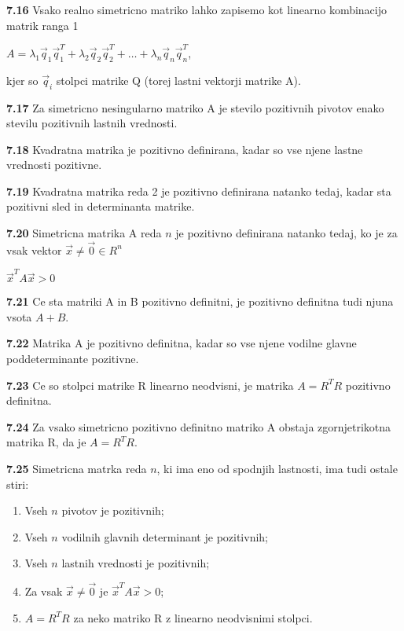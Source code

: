 \documentclass{article}
\begin{document}
\begin{multicols}{2}
\textbf{7.16} Vsako realno simetricno matriko lahko zapisemo kot linearno kombinacijo matrik ranga 1
\begin{center}
    \begin{math}
        A = \lambda_{1}\vec{q}_{1}\vec{q}_{1}^{T} + \lambda_{2}\vec{q}_{2}\vec{q}_{2}^{T} +
        \dots + \lambda_{n}\vec{q}_{n}\vec{q}_{n}^{T} 
    \end{math},
\end{center}
kjer so $\vec{q}_{i}$ stolpci matrike Q (torej lastni vektorji matrike A).

\textbf{7.17} Za simetricno nesingularno matriko A je stevilo pozitivnih pivotov enako
stevilu pozitivnih lastnih vrednosti.

\textbf{7.18} Kvadratna matrika je pozitivno definirana, kadar so vse njene lastne vrednosti pozitivne.

\textbf{7.19} Kvadratna matrika reda 2 je pozitivno definirana natanko tedaj, kadar sta 
pozitivni sled in determinanta matrike.

\textbf{7.20} Simetricna matrika A reda $n$ je pozitivno definirana natanko tedaj, ko je za vsak
vektor $\vec{x} \neq \vec{0} \in R^{n}$
\begin{center}
    $\vec{x}^{T}A\vec{x} > 0$
\end{center}

\textbf{7.21} Ce sta matriki A in B pozitivno definitni, je pozitivno definitna tudi 
njuna vsota $A + B$.

\textbf{7.22} Matrika A je pozitivno definitna, kadar so vse njene vodilne glavne poddeterminante pozitivne.

\textbf{7.23} Ce so stolpci matrike R linearno neodvisni, je matrika $A = R^{T}R$ pozitivno definitna.

\textbf{7.24} Za vsako simetricno pozitivno definitno matriko A obstaja zgornjetrikotna matrika R, da
je $A = R^{T}R$.

\textbf{7.25} Simetricna matrka reda $n$, ki ima eno od spodnjih lastnosti, ima tudi ostale stiri:
\begin{enumerate}
    \item Vseh $n$ pivotov je pozitivnih;
    \item Vseh $n$ vodilnih glavnih determinant je pozitivnih;
    \item Vseh $n$ lastnih vrednosti je pozitivnih;
    \item Za vsak $\vec{x} \neq \vec{0}$ je $\vec{x}^{T}A\vec{x} > 0$;
    \item $A= R^{T}R$ za neko matriko R z linearno neodvisnimi stolpci.
\end{enumerate}


\end{multicols}
\end{document}

